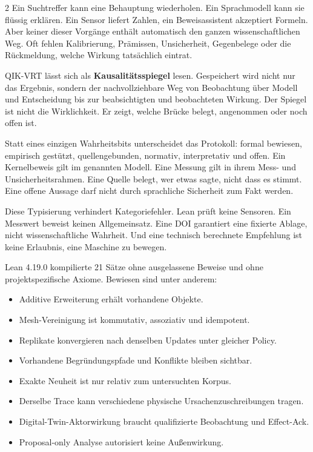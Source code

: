 \documentclass[10pt,a4paper]{article}
\newcommand{\head}[1]{\vspace{4mm}{\sffamily\Large\bfseries\color{Ink}#1}\par\vspace{1.5mm}}
\begin{document}
\begin{multicols}{2}
Ein Suchtreffer kann eine Behauptung wiederholen. Ein Sprachmodell kann sie
flüssig erklären. Ein Sensor liefert Zahlen, ein Beweisassistent akzeptiert
Formeln. Aber keiner dieser Vorgänge enthält automatisch den ganzen
wissenschaftlichen Weg. Oft fehlen Kalibrierung, Prämissen, Unsicherheit,
Gegenbelege oder die Rückmeldung, welche Wirkung tatsächlich eintrat.

QIK-VRT lässt sich als \textbf{Kausalitätsspiegel} lesen. Gespeichert wird nicht
nur das Ergebnis, sondern der nachvollziehbare Weg von Beobachtung über Modell
und Entscheidung bis zur beabsichtigten und beobachteten Wirkung. Der Spiegel
ist nicht die Wirklichkeit. Er zeigt, welche Brücke belegt, angenommen oder
noch offen ist.

\head{Sechs Erkenntnisarten}

Statt eines einzigen Wahrheitsbits unterscheidet das Protokoll: formal
bewiesen, empirisch gestützt, quellengebunden, normativ, interpretativ und
offen. Ein Kernelbeweis gilt im genannten Modell. Eine Messung gilt in ihrem
Mess- und Unsicherheitsrahmen. Eine Quelle belegt, wer etwas sagte, nicht dass
es stimmt. Eine offene Aussage darf nicht durch sprachliche Sicherheit zum
Fakt werden.

Diese Typisierung verhindert Kategoriefehler. Lean prüft keine Sensoren. Ein
Messwert beweist keinen Allgemeinsatz. Eine DOI garantiert eine fixierte
Ablage, nicht wissenschaftliche Wahrheit. Und eine technisch berechnete
Empfehlung ist keine Erlaubnis, eine Maschine zu bewegen.

\head{Was Lean geprüft hat}

Lean 4.19.0 kompilierte 21 Sätze ohne ausgelassene Beweise und ohne
projektspezifische Axiome. Bewiesen sind unter anderem:

\begin{itemize}
\item Additive Erweiterung erhält vorhandene Objekte.
\item Mesh-Vereinigung ist kommutativ, assoziativ und idempotent.
\item Replikate konvergieren nach denselben Updates unter gleicher Policy.
\item Vorhandene Begründungspfade und Konflikte bleiben sichtbar.
\item Exakte Neuheit ist nur relativ zum untersuchten Korpus.
\item Derselbe Trace kann verschiedene physische Ursachenzuschreibungen tragen.
\item Digital-Twin-Aktorwirkung braucht qualifizierte Beobachtung und Effect-Ack.
\item Proposal-only Analyse autorisiert keine Außenwirkung.
\end{itemize}


\end{multicols}
\end{document}
